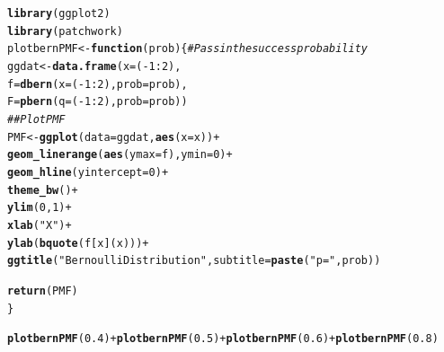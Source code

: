 \documentclass{article}\usepackage[]{graphicx}\usepackage[]{color}
\makeatletter
\newcommand{\hlnum}[1]{\textcolor[rgb]{0.686,0.059,0.569}{#1}}%
\newcommand{\hlstr}[1]{\textcolor[rgb]{0.192,0.494,0.8}{#1}}%
\newcommand{\hlcom}[1]{\textcolor[rgb]{0.678,0.584,0.686}{\textit{#1}}}%
\newcommand{\hlopt}[1]{\textcolor[rgb]{0,0,0}{#1}}%
\newcommand{\hlstd}[1]{\textcolor[rgb]{0.345,0.345,0.345}{#1}}%
\newcommand{\hlkwa}[1]{\textcolor[rgb]{0.161,0.373,0.58}{\textbf{#1}}}%
\newcommand{\hlkwb}[1]{\textcolor[rgb]{0.69,0.353,0.396}{#1}}%
\newcommand{\hlkwc}[1]{\textcolor[rgb]{0.333,0.667,0.333}{#1}}%
\newcommand{\hlkwd}[1]{\textcolor[rgb]{0.737,0.353,0.396}{\textbf{#1}}}%
\newenvironment{kframe}{%
 \def\at@end@of@kframe{}%
 \ifinner\ifhmode%
  \def\at@end@of@kframe{\end{minipage}}%
  \begin{minipage}{\columnwidth}%
 \fi\fi%
 \def\FrameCommand##1{\hskip\@totalleftmargin \hskip-\fboxsep
 \colorbox{shadecolor}{##1}\hskip-\fboxsep
     \hskip-\linewidth \hskip-\@totalleftmargin \hskip\columnwidth}%
 \MakeFramed {\advance\hsize-\width
   \@totalleftmargin\z@ \linewidth\hsize
   \@setminipage}}%
 {\par\unskip\endMakeFramed%
 \at@end@of@kframe}
\newenvironment{knitrout}{}{} %
\makeatother
\begin{document}
\begin{enumerate}
\begin{enumerate}
\begin{knitrout}
\color{fgcolor}\begin{kframe}
\begin{alltt}
\hlkwd{library}\hlstd{(ggplot2)}
\hlkwd{library}\hlstd{(patchwork)}
\hlstd{plotbernPMF} \hlkwb{<-} \hlkwa{function}\hlstd{(}\hlkwc{prob}\hlstd{)\{} \hlcom{# Pass in the success probability}
  \hlstd{ggdat} \hlkwb{<-} \hlkwd{data.frame}\hlstd{(}\hlkwc{x} \hlstd{= (}\hlopt{-}\hlnum{1}\hlopt{:}\hlnum{2}\hlstd{),}
                      \hlkwc{f} \hlstd{=} \hlkwd{dbern}\hlstd{(}\hlkwc{x} \hlstd{= (}\hlopt{-}\hlnum{1}\hlopt{:}\hlnum{2}\hlstd{),} \hlkwc{prob} \hlstd{= prob),}
                      \hlkwc{F} \hlstd{=} \hlkwd{pbern}\hlstd{(}\hlkwc{q} \hlstd{= (}\hlopt{-}\hlnum{1}\hlopt{:}\hlnum{2}\hlstd{),} \hlkwc{prob} \hlstd{= prob))}
  \hlcom{## Plot PMF}
  \hlstd{PMF} \hlkwb{<-} \hlkwd{ggplot}\hlstd{(}\hlkwc{data} \hlstd{= ggdat,} \hlkwd{aes}\hlstd{(}\hlkwc{x} \hlstd{= x))} \hlopt{+}
    \hlkwd{geom_linerange}\hlstd{(}\hlkwd{aes}\hlstd{(}\hlkwc{ymax} \hlstd{= f),} \hlkwc{ymin} \hlstd{=} \hlnum{0}\hlstd{)} \hlopt{+}
    \hlkwd{geom_hline}\hlstd{(}\hlkwc{yintercept} \hlstd{=} \hlnum{0}\hlstd{)} \hlopt{+}
    \hlkwd{theme_bw}\hlstd{()} \hlopt{+}
    \hlkwd{ylim}\hlstd{(}\hlnum{0}\hlstd{,} \hlnum{1}\hlstd{)} \hlopt{+}
    \hlkwd{xlab}\hlstd{(}\hlstr{"X"}\hlstd{)} \hlopt{+}
    \hlkwd{ylab}\hlstd{(}\hlkwd{bquote}\hlstd{(f[x](x)))} \hlopt{+}
    \hlkwd{ggtitle}\hlstd{(}\hlstr{"Bernoulli Distribution"}\hlstd{,}\hlkwc{subtitle} \hlstd{=} \hlkwd{paste}\hlstd{(}\hlstr{"p ="}\hlstd{, prob))}

  \hlkwd{return}\hlstd{(PMF)}
\hlstd{\}}

\hlkwd{plotbernPMF}\hlstd{(}\hlnum{0.4}\hlstd{)} \hlopt{+} \hlkwd{plotbernPMF}\hlstd{(}\hlnum{0.5}\hlstd{)} \hlopt{+} \hlkwd{plotbernPMF}\hlstd{(}\hlnum{0.6}\hlstd{)} \hlopt{+} \hlkwd{plotbernPMF}\hlstd{(}\hlnum{0.8}\hlstd{)}
\end{alltt}
\end{kframe}
\end{knitrout}


\end{enumerate}
\end{enumerate}
\end{document}
